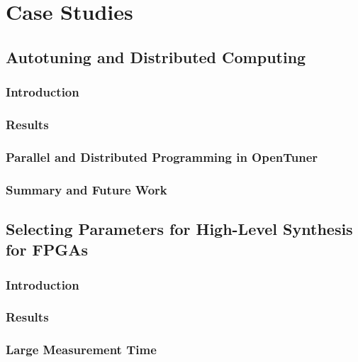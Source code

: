 \chapter{Case Studies}
\label{chap:usecases}



\section{Autotuning and Distributed Computing}
\label{sec:autotuningCloud}

\subsection{Introduction}
\label{subsec:CLintro}

\subsection{Results}
\label{subsec:CLres}

\subsection{Parallel and Distributed Programming in OpenTuner}
\label{subsec:parallel}

\subsection{Summary and Future Work}
\label{subsec:CLconcl}

\section{Selecting Parameters for High-Level Synthesis for FPGAs}
\label{sec:paramSelFPGA}

\subsection{Introduction}
\label{subsec:FPGAintro}

\subsection{Results}
\label{subsec:FPGAres}

\subsection{Large Measurement Time}
\label{subsec:bigtime}


